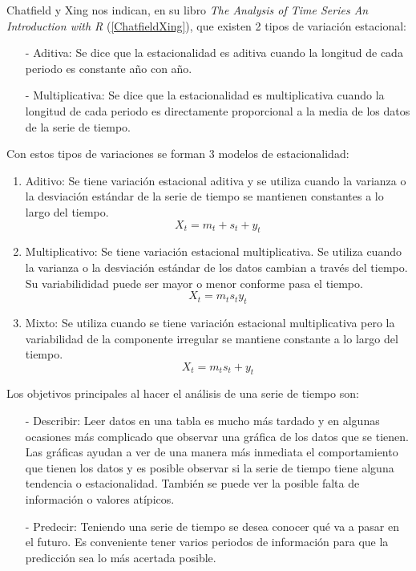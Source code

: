 Chatfield y Xing nos indican, en su libro \textit{The Analysis of Time Series An Introduction with R} (\ref{ChatfieldXing}), que existen 2 tipos de variación estacional:

\begin{itemize}
\item[-] Aditiva: Se dice que la estacionalidad es aditiva cuando la longitud de cada periodo es constante año con año.

\item[-] Multiplicativa: Se dice que la estacionalidad es multiplicativa cuando la longitud de cada periodo es directamente proporcional a la media de los datos de la serie de tiempo.
\end{itemize}

Con estos tipos de variaciones se forman 3 modelos de estacionalidad:

\begin{enumerate}
\item Aditivo: Se tiene variación estacional aditiva y se utiliza cuando la varianza o la desviación estándar de la serie de tiempo se mantienen constantes a lo largo del tiempo.
\begin{equation}
X_{t} = m_{t} + s_{t} + y_{t}
\end{equation}

\item Multiplicativo: Se tiene variación estacional multiplicativa. Se utiliza cuando la varianza o la desviación estándar de los datos cambian a través del tiempo. Su variabilididad puede ser mayor o menor conforme pasa el tiempo.
\begin{equation}
X_{t} = m_{t}s_{t}y_{t}
\end{equation}

\item Mixto: Se utiliza cuando se tiene variación estacional multiplicativa pero la variabilidad de la componente irregular se mantiene constante a lo largo del tiempo.
\begin{equation}
X_{t} = m_{t}s_{t} + y_{t}
\end{equation}
\end{enumerate}

Los objetivos principales al hacer el análisis de una serie de tiempo son:

\begin{itemize}
\item[-] Describir: Leer datos en una tabla es mucho más tardado y en algunas ocasiones más complicado que observar una gráfica de los datos que se tienen. Las gráficas ayudan a ver de una manera más inmediata el comportamiento que tienen los datos y es posible observar si la serie de tiempo tiene alguna tendencia o estacionalidad. También se puede ver la posible falta de información o valores atípicos.

\item[-] Predecir: Teniendo una serie de tiempo se desea conocer qué va a pasar en el futuro. Es conveniente tener varios periodos de información para que la predicción sea lo más acertada posible.
\end{itemize}

